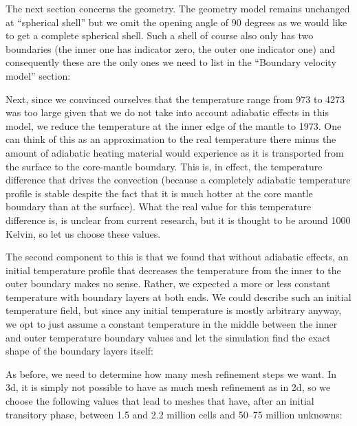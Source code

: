 \documentclass{article}
\begin{document}


The next section concerns the geometry. The geometry model remains unchanged at
``spherical shell'' but we omit the opening angle of 90 degrees as we would like
to get a complete spherical shell. Such a shell of course also only has two
boundaries (the inner one has indicator zero, the outer one indicator one) and
consequently these are the only ones we need to list in the ``Boundary velocity model''
section:



Next, since we convinced ourselves that the temperature range from 973 to 4273
was too large given that we do not take into account adiabatic effects in this
model, we reduce the temperature at the inner edge of the mantle to 1973. One
can think of this as an approximation to the real temperature there minus the
amount of adiabatic heating material would experience as it is transported from
the surface to the core-mantle boundary. This is, in effect, the temperature
difference that drives the convection (because a completely adiabatic
temperature profile is stable despite the fact that it is much hotter at the
core mantle boundary than at the surface). What the real value for this
temperature difference is, is unclear from current research, but it is thought
to be around 1000 Kelvin, so let us choose these values.



The second component to this is that we found that without adiabatic effects, an
initial temperature profile that decreases the temperature from the inner to the
outer boundary makes no sense. Rather, we expected a more or less constant
temperature with boundary layers at both ends. We could describe such an initial
temperature field, but since any initial temperature is mostly arbitrary anyway,
we opt to just assume a constant temperature in the middle between the inner and
outer temperature boundary values and let the simulation find the exact shape of
the boundary layers itself:



As before, we need to determine how many mesh refinement steps we want. In 3d,
it is simply not possible to have as much mesh refinement as in 2d, so we choose
the following values that lead to meshes that have, after an initial transitory
phase, between 1.5 and 2.2 million cells and 50--75 million unknowns:
\end{document}
